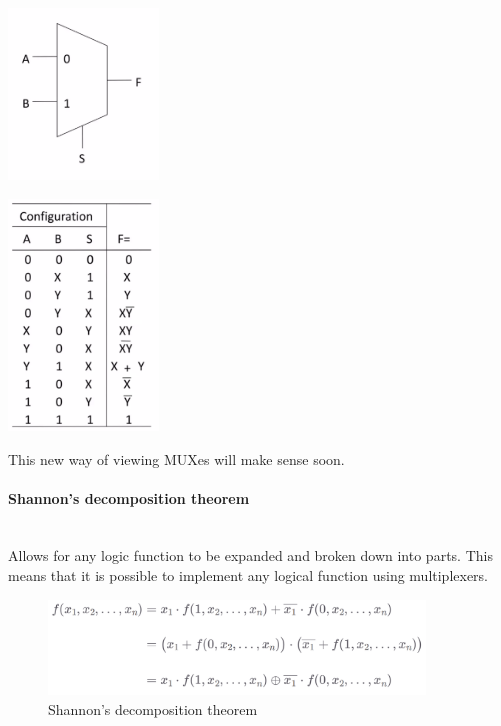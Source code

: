 \documentclass{article}
\begin{document}
\begin{minipage}[t]{0.5\textwidth}
    \centering
    \includegraphics[width=4cm, scale=1]{S2/2-1_mux.PNG}
\end{minipage}%
\begin{minipage}[t]{0.5\textwidth}
    \centering
    \includegraphics[width=4cm, scale=1]{S2/nonExTruthTable.PNG}
    \captionsetup{justification=centering}
\end{minipage}%

This new way of viewing MUXes will make sense soon.

\paragraph{Shannon's decomposition theorem}\mbox{}\\
Allows for any logic function to be expanded and broken down into parts.
This means that it is possible to implement any logical function using multiplexers.

\begin{figure}[htp]
    \centering
    \includegraphics[width=10cm, scale=1]{S2/shannonExpansion.PNG}
    \caption{Shannon's decomposition theorem}
\end{figure}
\end{document}
